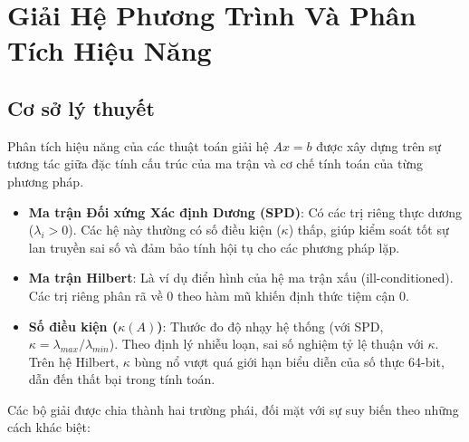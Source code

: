 \chapter{Giải Hệ Phương Trình Và Phân Tích Hiệu Năng}

\newpage

\section{Cơ sở lý thuyết}

Phân tích hiệu năng của các thuật toán giải hệ $Ax = b$ được xây dựng trên sự tương tác giữa đặc tính cấu trúc của ma trận và cơ chế tính toán của từng phương pháp.

\begin{itemize}[topsep=0pt, itemsep=2.5pt, leftmargin=1.5cm]
    \item \textbf{Ma trận Đối xứng Xác định Dương (SPD)}: Có các trị riêng thực dương ($\lambda_i > 0$). Các hệ này thường có số điều kiện ($\kappa$) thấp, giúp kiểm soát tốt sự lan truyền sai số và đảm bảo tính hội tụ cho các phương pháp lặp.
    \item \textbf{Ma trận Hilbert}: Là ví dụ điển hình của hệ ma trận xấu (ill-conditioned). Các trị riêng phân rã về 0 theo hàm mũ khiến định thức tiệm cận 0.
    \item \textbf{Số điều kiện ($\kappa(A)$)}: Thước đo độ nhạy hệ thống (với SPD, $\kappa = \lambda_{max}/\lambda_{min}$). Theo định lý nhiễu loạn, sai số nghiệm tỷ lệ thuận với $\kappa$. Trên hệ Hilbert, $\kappa$ bùng nổ vượt quá giới hạn biểu diễn của số thực 64-bit, dẫn đến thất bại trong tính toán.
\end{itemize}

Các bộ giải được chia thành hai trường phái, đối mặt với sự suy biến theo những cách khác biệt:

